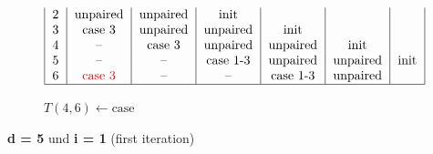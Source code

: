 \begin{figure}[H]
\begin{subfigure}[t]{0.65\textwidth}
\[\begin{tabular}{|c|c|c|c|c|c|c|}
                        2     & unpaired                & unpaired & init     &          &          &                         \\
                        3     & case 3                  & unpaired & unpaired & init     &          &                         \\
                        4     & --                      & case 3   & unpaired & unpaired & init     &                         \\
                        5     & --                      & --       & case 1-3 & unpaired & unpaired & init                    \\
                        6     & \textcolor{red}{case 3} & --       & --       & case 1-3 & unpaired & \textcolor{white}{init} \\ \hline
            \end{tabular}
        \]
        \caption{$T(4,6) \gets \text{case}$ }
    \end{subfigure}
    \caption{\textbf{d = 5} und \textbf{i = 1} (first iteration)}\label{fig:figure8}

\end{figure}